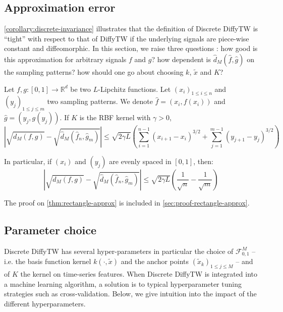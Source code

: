 \subsection{Approximation error}
\cref{corollary:discrete-invariance} illustrates that the definition of Discrete DiffyTW is ``tight'' with respect to that of DiffyTW if the underlying signals are piece-wise constant and diffeomorphic. In this section, we raise three questions : how good is this approximation for arbitrary signals $f$ and $g$? how dependent is $\hat d_M(\hat f, \hat g)$ on the sampling patterns? how should one go about choosing $k$, $\tilde x$ and $K$?

\begin{theorem}\label{thm:rectangle-approx}
Let $f,g:[0,1] \to \mathbb R^d$ be two $L$-Lipchitz functions. Let $(x_i)_{1\leq i \leq n}$ and $(y_j)_{1\leq j\leq m}$ two sampling patterns. We denote $\hat f = (x_i, f(x_i))$ and $\hat g = (y_j, g(y_j))$.
If $K$ is the RBF kernel with $\gamma > 0$,
\begin{equation}
    \left\vert \sqrt{d_M(f, g)} - \sqrt{\hat d_M(\hat f_n, \hat g_m)}\right\vert \leq \sqrt{2\gamma L}\left(\sum_{i=1}^{n-1} (x_{i+1} - x_i)^{3/2} + \sum_{j=1}^{m-1} (y_{j+1} - y_j)^{3/2}\right)
\end{equation}

In particular, if $(x_i)$ and $(y_j)$ are evenly spaced in $[0,1]$, then:
\begin{equation}
    \left\vert \sqrt{d_M(f, g)} - \sqrt{\hat d_M(\hat f_n, \hat g_m)}\right\vert \leq \sqrt{2\gamma L}\left(\frac{1}{\sqrt{n}} - \frac{1}{\sqrt{m}}\right)
\end{equation}
\end{theorem}


The proof on \cref{thm:rectangle-approx} is included in \cref{sec:proof-rectangle-approx}.

\subsection{Parameter choice}
Discrete DiffyTW has several hyper-parameters in particular the choice of $\mathcal F_{0,1}^M$ -- i.e. the basis function kernel $k(\cdot, \tilde x)$ and the anchor points $(\tilde x_k)_{1\leq j\leq M}$ -- and of $K$ the kernel on time-series features. When Discrete DiffyTW is integrated into a machine learning algorithm, a solution is to typical hyperparameter tuning strategies such as cross-validation. Below, we give intuition into the impact of the different hyperparameters.

